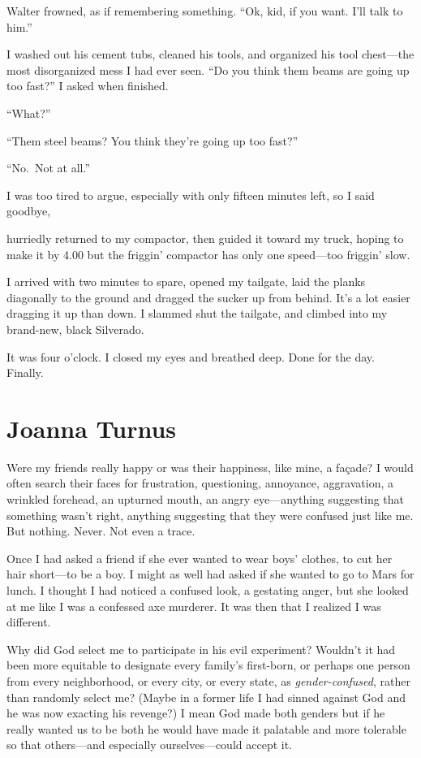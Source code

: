 Walter frowned, as if remembering something. ``Ok, kid, if you want.
I'll talk to him.''

I washed out his cement tubs, cleaned his tools, and organized his tool
chest---the most disorganized mess I had ever seen. ``Do you think them
beams are going up too fast?'' I asked when finished.

``What?''

``Them steel beams? You think they're going up too fast?''

``No.~Not at all.''

I was too tired to argue, especially with only fifteen minutes left, so
I said goodbye,

hurriedly returned to my compactor, then guided it toward my truck,
hoping to make it by 4.00 but the friggin' compactor has only one
speed---too friggin' slow.

I arrived with two minutes to spare, opened my tailgate, laid the planks
diagonally to the ground and dragged the sucker up from behind. It's a
lot easier dragging it up than down. I slammed shut the tailgate, and
climbed into my brand-new, black Silverado.

It was four o'clock. I closed my eyes and breathed deep. Done for the
day. Finally.

\chapter{Joanna Turnus}

\titlemark

Were my friends really happy or was their happiness, like mine, a
façade? I would often search their faces for frustration, questioning,
annoyance, aggravation, a wrinkled forehead, an upturned mouth, an angry
eye---anything suggesting that something wasn't right, anything
suggesting that they were confused just like me. But nothing. Never. Not
even a trace.

Once I had asked a friend if she ever wanted to wear boys' clothes, to
cut her hair short---to be a boy. I might as well had asked if she
wanted to go to Mars for lunch. I thought I had noticed a confused look,
a gestating anger, but she looked at me like I was a confessed axe
murderer. It was then that I realized I was different.

Why did God select me to participate in his evil experiment? Wouldn't it
had been more equitable to designate every family's first-born, or
perhaps one person from every neighborhood, or every city, or every
state, as \emph{gender-confused}, rather than randomly select me? (Maybe
in a former life I had sinned against God and he was now exacting his
revenge?) I mean God made both genders but if he really wanted us to be
both he would have made it palatable and more tolerable so that
others---and especially ourselves---could accept it.

